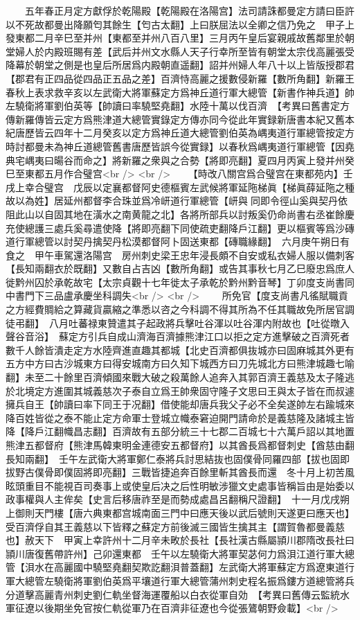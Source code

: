 　　五年春正月定方獻俘於乾陽殿【乾陽殿在洛陽宫】法司請誅都曼定方請曰臣許以不死故都曼出降願匄其餘生【匄古太翻】上曰朕屈法以全卿之信乃免之　甲子上發東都二月辛巳至并州【東都至并州八百八里】三月丙午皇后宴親戚故舊鄰里於朝堂婦人於内殿班賜有差【武后并州文水縣人天子行幸所至皆有朝堂太宗伐高麗張受降幕於朝堂之側是也皇后所居爲内殿朝直遥翻】詔并州婦人年八十以上皆版授郡君【郡君有正四品從四品正五品之差】百濟恃高麗之援數侵新羅【數所角翻】新羅王春秋上表求救辛亥以左武衛大將軍蘇定方爲神丘道行軍大總管【新書作神兵道】帥左驍衛將軍劉伯英等【帥讀曰率驍堅堯翻】水陸十萬以伐百濟　【考異曰舊書定方傳新羅傳皆云定方爲熊津道大總管實錄定方傳亦同今從此年實録新唐書本紀又舊本紀唐歷皆云四年十二月癸亥以定方爲神丘道大總管劉伯英為嵎夷道行軍總管按定方時討都曼未為神丘道總管舊書唐歷皆誤今從實録】以春秋爲嵎夷道行軍總管【因堯典宅嵎夷曰暘谷而命之】將新羅之衆與之合勢【將即亮翻】夏四月丙寅上發并州癸巳至東都五月作合璧宫<br />
<br />
　　【時改八關宫爲合璧宫在東都苑内】壬戌上幸合璧宫　戊辰以定襄都督阿史德樞賓左武候將軍延陁梯眞【梯眞薛延陁之種故以為姓】居延州都督李合珠並爲冷岍道行軍總管【岍與同即令徑山奚與契丹依阻此山以自固其地在潢水之南黄龍之北】各將所部兵以討叛奚仍命尚書右丞崔餘慶充使總護三處兵奚尋遣使降【將即亮翻下同使疏吏翻降戶江翻】更以樞賓等爲沙磚道行軍總管以討契丹擒契丹松漠都督阿卜固送東都【磚職緣翻】　六月庚午朔日有食之　甲午車駕還洛陽宫　房州刺史梁王忠年浸長頗不自安或私衣婦人服以備刺客【長知兩翻衣於既翻】又數自占吉凶【數所角翻】或告其事秋七月乙巳廢忠爲庶人徙黔州囚於承乾故宅【太宗貞觀十七年徙太子承乾於黔州黔音琴】丁卯度支尚書同中書門下三品盧承慶坐科調失<br />
<br />
　　所免官【度支尚書凡徭賦職貢之方經費賙給之算藏貨贏縮之準悉以咨之今科調不得其所為不任其職故免所居官調徒弔翻】　八月吐蕃禄東贊遣其子起政將兵擊吐谷渾以吐谷渾内附故也【吐從暾入聲谷音浴】　蘇定方引兵自成山濟海百濟據熊津江口以拒之定方進擊破之百濟死者數千人餘皆潰走定方水陸齊進直趣其都城【北史百濟都俱抜城亦曰固麻城其外更有五方中方曰古沙城東方曰得安城南方曰久知下城西方曰刀先城北方曰熊津城趣七喻翻】未至二十餘里百濟傾國來戰大破之殺萬餘人追奔入其郭百濟王義慈及太子隆逃於北境定方進圍其城義慈次子泰自立爲王帥衆固守隆子文思曰王與太子皆在而叔遽擁兵自王【帥讀曰率下同王于况翻】借使能却唐兵我父子必不全矣遂帥左右踰城來降百姓皆從之泰不能止定方命軍士登城立幟泰窘迫開門請命於是義慈隆及諸城主皆降【降戶江翻幟昌志翻】百濟故有五部分統三十七郡二百城七十六萬戶詔以其地置熊津五都督府【熊津馬韓東明金連德安五都督府】以其酋長爲都督刺史【酋慈由翻長知兩翻】　壬午左武衛大將軍鄭仁泰將兵討思結抜也固僕骨同羅四部【拔也固即拔野古僕骨即僕固將即亮翻】三戰皆捷追奔百餘里斬其酋長而還　冬十月上初苦風眩頭重目不能視百司奏事上或使皇后决之后性明敏涉獵文史處事皆稱旨由是始委以政事權與人主侔矣【史言后移唐祚至是而勢成處昌呂翻稱尺證翻】　十一月戊戌朔上御則天門樓【唐六典東都宫城南面三門中曰應天後以武后號則天遂更曰應天也】受百濟俘自其王義慈以下皆釋之蘇定方前後滅三國皆生擒其主【謂賀魯都曼義慈也】赦天下　甲寅上幸許州十二月辛未畋於長社【長社漢古縣屬頴川郡隋改長社曰頴川唐復舊帶許州】己卯還東都　壬午以左驍衛大將軍契苾何力爲浿江道行軍大總管【浿水在高麗國中驍堅堯翻契欺訖翻浿普蓋翻】左武衛大將軍蘇定方爲遼東道行軍大總管左驍衛將軍劉伯英爲平壤道行軍大總管蒲州刺史程名振爲鏤方道總管將兵分道擊高麗青州刺史劉仁軌坐督海運覆船以白衣從軍自効　【考異曰舊傳云監統水軍征遼以後期坐免官按仁軌從軍乃在百濟非征遼也今從張鷟朝野僉載】<br />
